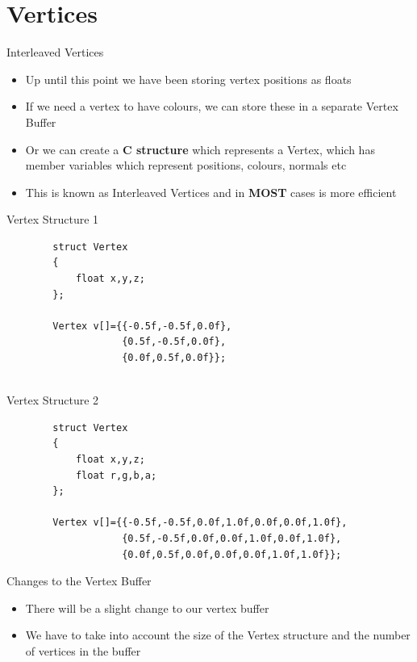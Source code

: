 \part{Vertices}
\frame{\partpage}

\begin{frame}{Interleaved Vertices}
	\begin{itemize}
		\pause\item Up until this point we have been storing vertex positions as floats
		\pause\item If we need a vertex to have colours, we can store these in a separate Vertex Buffer
		\pause\item Or we can create a \textbf{C structure} which represents a Vertex, which has member variables which represent positions, colours, normals etc
		\pause\item This is known as Interleaved Vertices and in \pause\textbf{MOST} cases is more efficient
	\end{itemize}
\end{frame}

\begin{frame}[fragile]{Vertex Structure 1}
	\begin{lstlisting}
		struct Vertex
		{
			float x,y,z;
		};
		
		Vertex v[]={{-0.5f,-0.5f,0.0f},
					{0.5f,-0.5f,0.0f},
					{0.0f,0.5f,0.0f}};
					 
	\end{lstlisting}
\end{frame}

\begin{frame}[fragile]{Vertex Structure 2}
	\begin{lstlisting}
		struct Vertex
		{
			float x,y,z;
			float r,g,b,a;
		};
		
		Vertex v[]={{-0.5f,-0.5f,0.0f,1.0f,0.0f,0.0f,1.0f},
					{0.5f,-0.5f,0.0f,0.0f,1.0f,0.0f,1.0f},
					{0.0f,0.5f,0.0f,0.0f,0.0f,1.0f,1.0f}};
	\end{lstlisting}
\end{frame}

\begin{frame}{Changes to the Vertex Buffer}
	\begin{itemize}
		\pause\item There will be a slight change to our vertex buffer
		\pause\item We have to take into account the size of the Vertex structure and the number of vertices in the buffer
	\end{itemize}
\end{frame}

